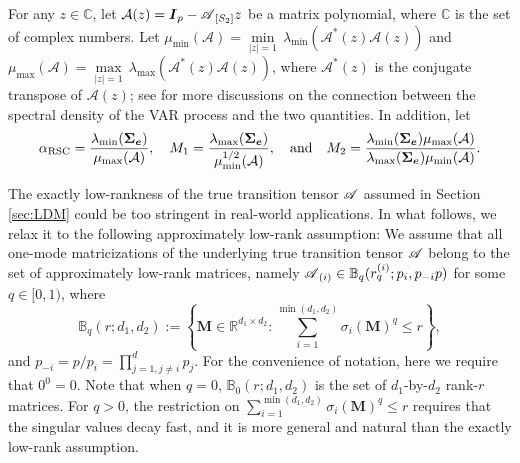 \documentclass[12pt]{article}
\newcommand{\bm}{\boldsymbol}
\newcommand{\cm}[1]{\mbox{\boldmath$\mathscr{#1}$}}
\begin{document}
For any $z\in\mathbb{C}$, let $\mathcal{A}(z)=\bm{I}_{p}-\cm{A}_{[S_2]}z$ be a matrix polynomial, where $\mathbb{C}$ is the set of complex numbers. Let
$\mu_{\min}(\mathcal{A})=\underset{|z|=1}{\min}\,\lambda_{\min}(\mathcal{A}^*(z)\mathcal{A}(z))$ and $\mu_{\max}(\mathcal{A})=\underset{|z|=1}{\max}\,\lambda_{\max}(\mathcal{A}^*(z)\mathcal{A}(z))$, where $\mathcal{A}^*(z)$ is the conjugate transpose of $\mathcal{A}(z)$; see \cite{basu2015regularized} for more discussions on the connection between the spectral density of the VAR process and the two quantities. In addition, let
\[
\alpha_{\textup{RSC}}=\frac{\lambda_{\min}(\bm{\Sigma_e})}{\mu_{\max}(\mathcal{A})}, \quad M_1=\frac{\lambda_{\max}(\bm{\Sigma_e})}{\mu^{1/2}_{\min}(\mathcal{A})}, \quad\text{and}\quad M_2=\frac{\lambda_{\min}(\bm{\Sigma}_{\bm{e}})\mu_{\max}(\mathcal{A})}{\lambda_{\max}(\bm{\Sigma_e})\mu_{\min}(\mathcal{A})}.
\]

The exactly low-rankness of the true transition tensor $\cm{A}$ assumed in Section \ref{sec:LDM}  could be too stringent in real-world applications. In what follows, we relax it to  the following approximately low-rank assumption:	We assume that all one-mode matricizations of the underlying true transition tensor $\cm{A}$ belong to the set of approximately low-rank matrices, namely $\cm{A}_{(i)}\in\mathbb{B}_q(r_q^{(i)};p_i,p_{-i}p)$ for some $q\in[0,1)$, where
\begin{equation}
	\mathbb{B}_q(r;d_1,d_2):=\left\{\bm{M}\in\mathbb{R}^{d_1\times d_2}:\sum_{i=1}^{\min(d_1,d_2)}\sigma_i(\bm{M})^q\leq r\right\},
\end{equation}
and $p_{-i}=p/p_i=\prod_{j=1,j\neq i}^{d}p_j$. For the convenience of notation, here we require that $0^0=0$. Note that when $q=0$, $\mathbb{B}_0(r;d_1,d_2)$ is the set of $d_1$-by-$d_2$ rank-$r$ matrices. For $q>0$, the restriction on $\sum_{i=1}^{\min(d_1,d_2)}\sigma_i(\bm{M})^q\leq r$ requires that the singular values decay fast, and it is more general and natural than the exactly low-rank assumption.




\end{document}
